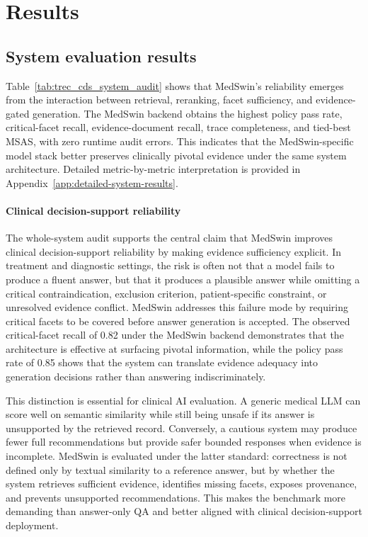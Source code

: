 \documentclass[conference]{IEEEtran}
\begin{document}
\section{Results}

\subsection{System evaluation results}
Table~\ref{tab:trec_cds_system_audit} shows that MedSwin's reliability emerges from the interaction between retrieval, reranking, facet sufficiency, and evidence-gated generation. The MedSwin backend obtains the highest policy pass rate, critical-facet recall, evidence-document recall, trace completeness, and tied-best MSAS, with zero runtime audit errors. This indicates that the MedSwin-specific model stack better preserves clinically pivotal evidence under the same system architecture. Detailed metric-by-metric interpretation is provided in Appendix~\ref{app:detailed-system-results}.

\paragraph{Clinical decision-support reliability}
The whole-system audit supports the central claim that MedSwin improves clinical decision-support reliability by making evidence sufficiency explicit. In treatment and diagnostic settings, the risk is often not that a model fails to produce a fluent answer, but that it produces a plausible answer while omitting a critical contraindication, exclusion criterion, patient-specific constraint, or unresolved evidence conflict. MedSwin addresses this failure mode by requiring critical facets to be covered before answer generation is accepted. The observed critical-facet recall of 0.82 under the MedSwin backend demonstrates that the architecture is effective at surfacing pivotal information, while the policy pass rate of 0.85 shows that the system can translate evidence adequacy into generation decisions rather than answering indiscriminately.

This distinction is essential for clinical AI evaluation. A generic medical LLM can score well on semantic similarity while still being unsafe if its answer is unsupported by the retrieved record. Conversely, a cautious system may produce fewer full recommendations but provide safer bounded responses when evidence is incomplete. MedSwin is evaluated under the latter standard: correctness is not defined only by textual similarity to a reference answer, but by whether the system retrieves sufficient evidence, identifies missing facets, exposes provenance, and prevents unsupported recommendations. This makes the benchmark more demanding than answer-only QA and better aligned with clinical decision-support deployment.
\end{document}
